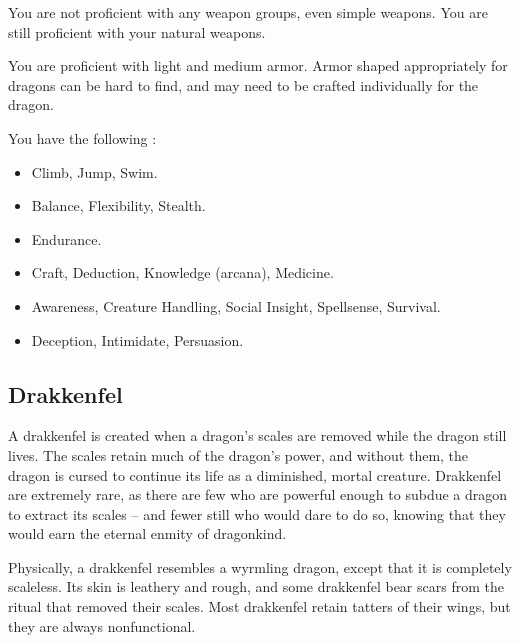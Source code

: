             You are not proficient with any weapon groups, even simple weapons.
            You are still proficient with your natural weapons.

            You are proficient with light and medium armor.
            Armor shaped appropriately for dragons can be hard to find, and may need to be crafted individually for the dragon.

            You have the following :
            \begin{itemize}
                \item {} Climb, Jump, Swim.
                \item {} Balance, Flexibility, Stealth.
                \item {} Endurance.
                \item {} Craft, Deduction, Knowledge (arcana), Medicine.
                \item {} Awareness, Creature Handling, Social Insight, Spellsense, Survival.
                \item {} Deception, Intimidate, Persuasion.
            \end{itemize}

    \subsection{Drakkenfel}

        A drakkenfel is created when a dragon's scales are removed while the dragon still lives. The scales retain much of the dragon's power, and without them, the dragon is cursed to continue its life as a diminished, mortal creature.
        Drakkenfel are extremely rare, as there are few who are powerful enough to subdue a dragon to extract its scales -- and fewer still who would dare to do so, knowing that they would earn the eternal enmity of dragonkind.

        Physically, a drakkenfel resembles a wyrmling dragon, except that it is completely scaleless.
        Its skin is leathery and rough, and some drakkenfel bear scars from the ritual that removed their scales.
        Most drakkenfel retain tatters of their wings, but they are always nonfunctional.

